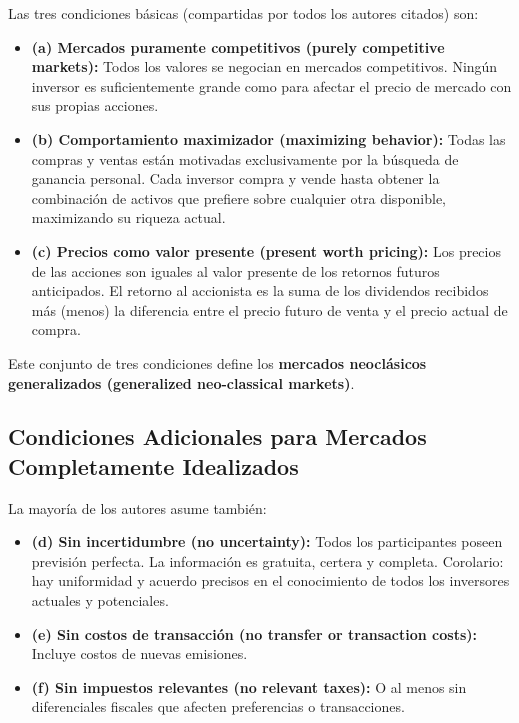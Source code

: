 \documentclass[12pt]{article}
\begin{document}
Las tres condiciones b\'asicas (compartidas por todos los autores citados) son:

\begin{itemize}
  \item \textbf{(a) Mercados puramente competitivos (purely competitive markets):} Todos los valores se negocian en mercados competitivos. Ning\'un inversor es suficientemente grande como para afectar el precio de mercado con sus propias acciones.

  \item \textbf{(b) Comportamiento maximizador (maximizing behavior):} Todas las compras y ventas est\'an motivadas exclusivamente por la b\'usqueda de ganancia personal. Cada inversor compra y vende hasta obtener la combinaci\'on de activos que prefiere sobre cualquier otra disponible, maximizando su riqueza actual.

  \item \textbf{(c) Precios como valor presente (present worth pricing):} Los precios de las acciones son iguales al valor presente de los retornos futuros anticipados. El retorno al accionista es la suma de los dividendos recibidos m\'as (menos) la diferencia entre el precio futuro de venta y el precio actual de compra.
\end{itemize}

Este conjunto de tres condiciones define los \textbf{mercados neocl\'asicos generalizados (generalized neo-classical markets)}.

\subsection{Condiciones Adicionales para Mercados Completamente Idealizados}

La mayor\'ia de los autores asume tambi\'en:

\begin{itemize}
  \item \textbf{(d) Sin incertidumbre (no uncertainty):} Todos los participantes poseen previsi\'on perfecta. La informaci\'on es gratuita, certera y completa. Corolario: hay uniformidad y acuerdo precisos en el conocimiento de todos los inversores actuales y potenciales.

  \item \textbf{(e) Sin costos de transacci\'on (no transfer or transaction costs):} Incluye costos de nuevas emisiones.

  \item \textbf{(f) Sin impuestos relevantes (no relevant taxes):} O al menos sin diferenciales fiscales que afecten preferencias o transacciones.
\end{itemize}
\end{document}
